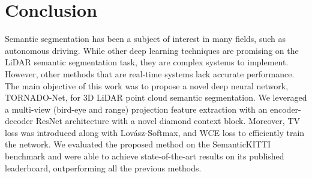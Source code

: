 \documentclass{article}
\begin{document}
\section{Conclusion}
\label{sec:conclusion}
	
Semantic segmentation has been a subject of interest in many fields, such as autonomous driving. While other deep learning techniques are promising on the LiDAR semantic segmentation task, they are complex systems to implement. However, other methods that are real-time systems lack accurate performance. The main objective of this work was to propose a novel deep neural network, TORNADO-Net, for 3D LiDAR point cloud semantic segmentation.  We leveraged a multi-view (bird-eye and range) projection feature extraction with an encoder-decoder ResNet architecture with a novel diamond context block. Moreover, TV loss was introduced along with Lov\'asz-Softmax, and WCE loss to efficiently train the network. We evaluated the proposed method on the SemanticKITTI benchmark and were able to achieve state-of-the-art results on its published leaderboard, outperforming all the previous methods. 





\clearpage






{\small


}
\end{document}
